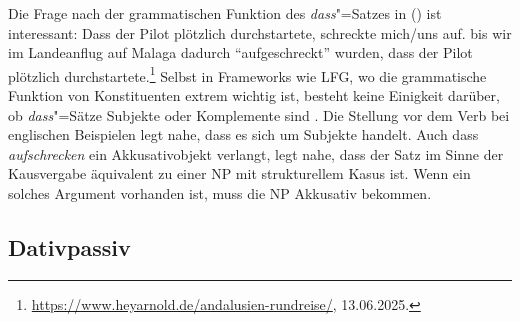 %
%
%
%
%

Die Frage nach der grammatischen Funktion des \emph{dass}"=Satzes in () ist interessant:
\eal
\ex Dass der Pilot plötzlich durchstartete, schreckte mich/uns auf.
\ex bis wir im Landeanflug auf Malaga dadurch "`aufgeschreckt"'
    wurden, dass der Pilot plötzlich durchstartete.\footnote{%
\url{https://www.heyarnold.de/andalusien-rundreise/}, 13.06.2025.
}
\zl
Selbst in Frameworks wie LFG, wo die grammatische Funktion von Konstituenten extrem wichtig ist,
besteht keine Einigkeit darüber, ob \emph{dass}"=Sätze Subjekte oder Komplemente sind \citep*{DL2000a-u,Berman2003b-u,Berman2007a-u,AMM2005a-u,Forst2006a-u}. Die Stellung
vor dem Verb bei englischen Beispielen legt nahe, dass es sich um Subjekte handelt. Auch dass
\emph{aufschrecken} ein Akkusativobjekt verlangt, legt nahe, dass der Satz im Sinne der Kausvergabe
äquivalent zu einer NP mit strukturellem Kasus ist. Wenn ein solches Argument vorhanden ist, muss
die NP Akkusativ bekommen.




\subsection{Dativpassiv}
\label{sec:dat-pass}

